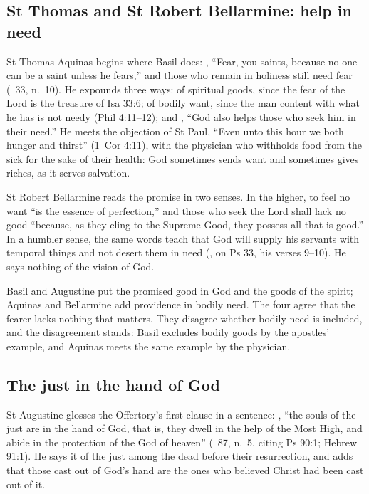 \subsection{St Thomas and St Robert Bellarmine: help in need}
\label{sec:no-want-thomas-bellarmine}

St Thomas Aquinas begins where Basil does: , ``Fear, you saints, because no
one can be a saint unless he fears,'' and those who remain in holiness still
need fear (\ 33, n.~10). He expounds 
three ways: of spiritual goods, since the fear of the Lord is the treasure of
Isa 33:6; of bodily want, since the man content with what he has is not needy
(Phil 4:11--12); and ,
``God also helps those who seek him in their need.'' He meets the objection of
St Paul, ``Even unto this hour we both hunger and thirst'' (1~Cor 4:11), with
the physician who withholds food from the sick for the sake of their health:
God sometimes sends want and sometimes gives riches, as it serves salvation.

St Robert Bellarmine reads the promise in two senses. In the higher, to feel
no want ``is the essence of perfection,'' and those who seek the Lord shall
lack no good ``because, as they cling to the Supreme Good, they possess all
that is good.'' In a humbler sense, the same words teach that God will supply
his servants with temporal things and not desert them in need
(, on Ps 33, his verses 9--10). He says nothing of the
vision of God.

Basil and Augustine put the promised good in God and the goods of the spirit;
Aquinas and Bellarmine add providence in bodily need. The four agree that the
fearer lacks nothing that matters. They disagree whether bodily need is
included, and the disagreement stands: Basil excludes bodily goods by the
apostles' example, and Aquinas meets the same example by the physician.

\subsection{The just in the hand of God}
\label{sec:no-want-offertory}

St Augustine glosses the Offertory's first clause in a sentence:
, ``the souls of the just are
in the hand of God, that is, they dwell in the help of the Most High, and abide
in the protection of the God of heaven'' (\ 87, n.~5,
citing Ps 90:1; Hebrew 91:1). He says it of the just among the dead before their
resurrection, and adds that those cast out of God's hand are the ones who
believed Christ had been cast out of it.

